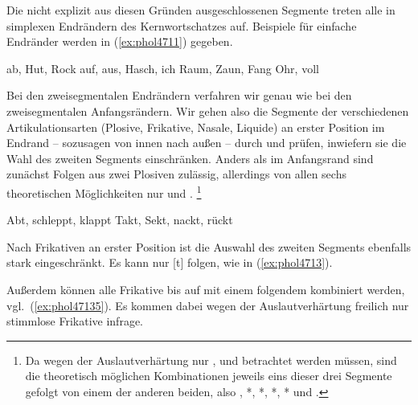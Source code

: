Die nicht explizit aus diesen Gründen ausgeschlossenen Segmente treten alle in simplexen Endrändern des Kernwortschatzes auf.
Beispiele für einfache Endränder werden in (\ref{ex:phol4711}) gegeben.


\begin{exe}
  \ex\label{ex:phol4711}
  \begin{xlist}
    \ex ab, Hut, Rock
    \ex auf, aus, Hasch, ich
    \ex Raum, Zaun, Fang
    \ex Ohr, voll
  \end{xlist}
\end{exe}

Bei den zweisegmentalen Endrändern verfahren wir genau wie bei den zweisegmentalen Anfangsrändern.
Wir gehen also die Segmente der verschiedenen Artikulationsarten (Plosive, Frikative, Nasale, Liquide) an erster Position im Endrand -- sozusagen von innen nach außen -- durch und prüfen, inwiefern sie die Wahl des zweiten Segments einschränken.
Anders als im Anfangsrand sind zunächst Folgen aus zwei Plosiven zulässig, allerdings von allen sechs theoretischen Möglichkeiten nur \textipa{[pt]} und \textipa{[kt]}.%
\footnote{Da wegen der Auslautverhärtung nur \textipa{[k]}, \textipa{[t]} und \textipa{[p]} betrachtet werden müssen, sind die theoretisch möglichen Kombinationen jeweils eins dieser drei Segmente gefolgt von einem der anderen beiden, also \textipa{[kt]}, *\textipa{[kp]}, *\textipa{[tk]}, *\textipa{[tp]}, *\textipa{[pk]} und \textipa{[pt]}.}

\begin{exe}
  \ex\label{ex:phol4712}
  \begin{xlist}
    \ex Abt, schleppt, klappt
    \ex Takt, Sekt, nackt, rückt
  \end{xlist}
\end{exe}

Nach Frikativen an erster Position ist die Auswahl des zweiten Segments ebenfalls stark eingeschränkt.
Es kann nur [t] folgen, wie in (\ref{ex:phol4713}).

\begin{exe}
\end{exe}

Außerdem können alle Frikative bis auf \textipa{[s]} mit einem folgendem \textipa{[s]} kombiniert werden, vgl.\ (\ref{ex:phol47135}).
Es kommen dabei wegen der Auslautverhärtung freilich nur stimmlose Frikative infrage.

\begin{exe}
\end{exe}

